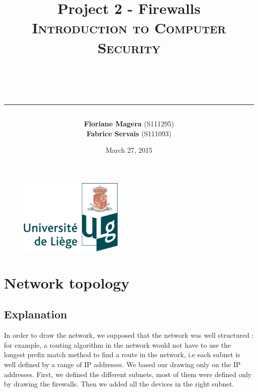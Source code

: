 \documentclass[a4paper,titlepage]{article}
\begin{document}
\begin{titlepage}

\begin{figure}
\centering
\includegraphics[width=5cm]{logo-ulg.png}
\end{figure}



\title{
\vspace{0.2cm}
\LARGE{\textbf{Project 2 - Firewalls}} \\ \textsc{Introduction to Computer Security}
\author{\textbf{Floriane Magera} \small{(S111295})\\\textbf{Fabrice Servais} \small{(S111093})}\\
\date{March 27, 2015}
\rule{15cm}{1.5pt}
}

\end{titlepage}

\pagestyle{fancy}

\maketitle


\section{Network topology}
\subsection{Explanation}
In order to draw the network, we supposed that the network was well structured : for example, a routing algorithm in the network would not have to use the longest prefix match method to find a route in the network, i.e each subnet is well defined by a range of IP addresses. We based our drawing only on the IP addresses. First, we defined the different subnets, most of them were defined only by drawing the firewalls. Then we added all the devices in the right subnet. \\ \\
\end{document}

